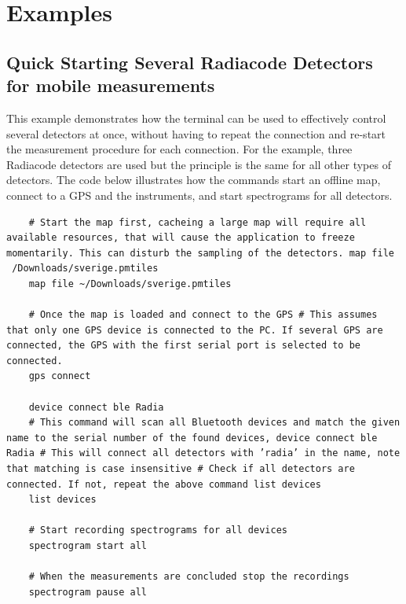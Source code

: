 \section{Examples}

\subsection{Quick Starting Several Radiacode Detectors for mobile measurements}
This example demonstrates how the terminal can be used to effectively control several detectors at once, without having to repeat the connection and re-start the measurement procedure for each connection. For the example, three Radiacode detectors are used but the principle is the same for all other types of detectors. The code below illustrates how the commands start an offline map, connect to a GPS and the instruments, and start spectrograms for all detectors.

\begin{verbatim}
    # Start the map first, cacheing a large map will require all available resources, that will cause the application to freeze momentarily. This can disturb the sampling of the detectors. map file  /Downloads/sverige.pmtiles
    map file ~/Downloads/sverige.pmtiles

    # Once the map is loaded and connect to the GPS # This assumes that only one GPS device is connected to the PC. If several GPS are connected, the GPS with the first serial port is selected to be connected.
    gps connect

    device connect ble Radia
    # This command will scan all Bluetooth devices and match the given name to the serial number of the found devices, device connect ble Radia # This will connect all detectors with ’radia’ in the name, note that matching is case insensitive # Check if all detectors are connected. If not, repeat the above command list devices
    list devices

    # Start recording spectrograms for all devices
    spectrogram start all 

    # When the measurements are concluded stop the recordings
    spectrogram pause all
\end{verbatim}


